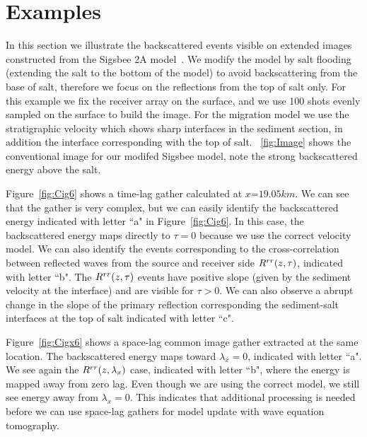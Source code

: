 

\section{Examples}

In this section we illustrate the backscattered events visible on extended images constructed from the Sigsbee 2A model~\cite{Sigsbee}. 
We modify the model by salt flooding (extending the salt to the bottom
of the model) to avoid backscattering from the base 
of salt, therefore we focus on the reflections from the top of salt only. For this example we fix the receiver array on 
the surface, and we use 100 shots evenly sampled on the surface to build 
the image. For the migration model we use the stratigraphic
velocity which shows sharp interfaces in the sediment section, in addition the interface corresponding with the top of salt. 
~\ref{fig:Image} shows the conventional image for our modifed Sigsbee model, note the strong backscattered
energy above the salt.

Figure~\ref{fig:Cig6} shows a time-lag gather calculated at $x$=$19.05km$.
We can see that the gather is very complex, but we can easily identify the backscattered energy indicated with letter ``a" in Figure~\ref{fig:Cig6}.
 In this case, the backscattered energy maps directly to $\tau=0$ because we use the correct velocity model.
We can also identify the events corresponding to the cross-correlation between reflected waves from the source and receiver side $R^{rr}(z,\tau)$, indicated
with letter ``b". The $R^{rr}(z,\tau)$ events have positive slope (given by the sediment velocity at the interface) and are 
visible for $\tau>0$. We can also observe a abrupt change
in the slope of the primary reflection corresponding the sediment-salt interfaces at the top of salt indicated with letter ``c".

Figure~\ref{fig:Cigx6} shows a space-lag common image gather extracted at the same location. The backscattered energy maps toward $\lambda_x=0$, indicated with 
letter ``a". We see again the $R^{rr}(z,\lambda_x)$ case, indicated with letter ``b", where the energy is mapped away from zero lag.  
Even though we are using the correct model, we still see energy away from $\lambda_x=0$. This indicates that additional processing is needed before 
we can use space-lag gathers for model update with wave equation tomography.

